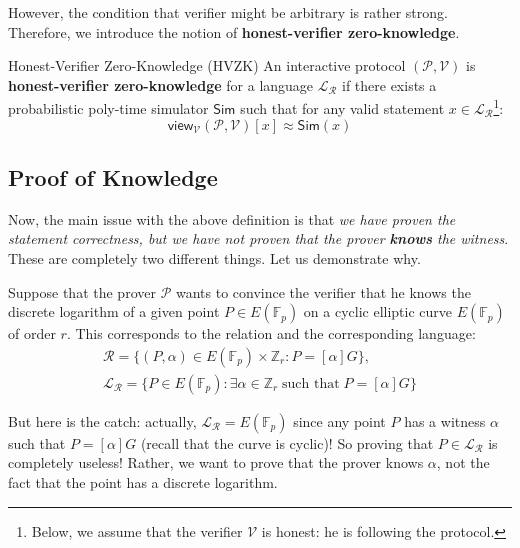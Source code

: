 \documentclass[../lecture-notes.tex]{subfiles}
\begin{document}
However, the condition that verifier might be arbitrary is rather strong. Therefore, we introduce the notion of \textbf{honest-verifier zero-knowledge}.

\begin{definition}{Honest-Verifier Zero-Knowledge (HVZK)}
    An interactive protocol $(\mathcal{P}, \mathcal{V})$ is \textbf{honest-verifier zero-knowledge} for a language $\mathcal{L}_{\mathcal{R}}$ if there exists a probabilistic poly-time simulator $\mathsf{Sim}$ such that for any valid statement $x \in \mathcal{L}_{\mathcal{R}}$\footnote{Below, we assume that the verifier $\mathcal{V}$ is honest: he is following the protocol.}:
    \begin{equation*}
        \mathsf{view}_{\mathcal{V}}(\mathcal{P}, \mathcal{V})[x] \approx \mathsf{Sim}(x)
    \end{equation*}
\end{definition}

\subsection{Proof of Knowledge}

Now, the main issue with the above definition is that \textit{we have proven the statement correctness, but we have not proven that the prover \textbf{knows} the witness}. These are completely two different things. Let us demonstrate why.

\begin{example}
    Suppose that the prover $\mathcal{P}$ wants to convince the verifier that he knows the discrete logarithm of a given point $P \in E(\mathbb{F}_p)$ on a cyclic elliptic curve $E(\mathbb{F}_p)$ of order $r$. This corresponds to the relation and the corresponding language:
    \begin{align*}
        \mathcal{R} = \{(P, \alpha) \in E(\mathbb{F}_p) \times \mathbb{Z}_r: P = [\alpha] G\}, \\ \mathcal{L}_{\mathcal{R}} = \{P \in E(\mathbb{F}_p): \exists \alpha \in \mathbb{Z}_r \; \text{such that} \; P = [\alpha] G\}
    \end{align*}

    But here is the catch: actually, $\mathcal{L}_{\mathcal{R}} = E(\mathbb{F}_p)$ since any point $P$ has a witness $\alpha$ such that $P = [\alpha] G$ (recall that the curve is cyclic)! So proving that $P \in \mathcal{L}_{\mathcal{R}}$ is completely useless! Rather, we want to prove that the prover knows $\alpha$, not the fact that the point has a discrete logarithm.
\end{example}
\end{document}

